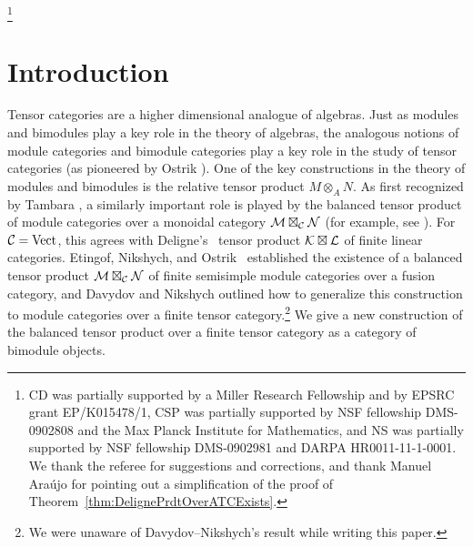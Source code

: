 \documentclass{amsart}
\begin{document}
\thanks{CD was partially supported by a Miller Research Fellowship and by EPSRC grant EP/K015478/1, CSP was partially supported by NSF fellowship DMS-0902808 and the Max Planck Institute for Mathematics, and NS was partially supported by NSF fellowship DMS-0902981 and DARPA HR0011-11-1-0001.  We thank the referee for suggestions and corrections, and thank Manuel Ara\'ujo for pointing out a simplification of the proof of Theorem~\ref{thm:DelignePrdtOverATCExists}.
}


\maketitle	

\tikzexternaldisable


\section{Introduction}

Tensor categories are a higher dimensional analogue of algebras.  Just as modules and bimodules play a key role in the theory of algebras, the analogous notions of module categories and bimodule categories play a key role in the study of tensor categories (as pioneered by Ostrik \cite{MR1976459}).  One of the key constructions in the theory of modules and bimodules is the relative tensor product $M \otimes_A N$.  As first recognized by Tambara \cite{tambara}, a similarly important role is played by the balanced tensor product of module categories over a monoidal category $\mathcal M \boxtimes_\mathcal C \mathcal N$ (for example, see \cite{MR1966524, 0909.3140, MR2511638, MR2909758, 1202.4396, MR3022755, MR3063919}).  For $\mathcal C = \mathrm{Vect}$, this agrees with Deligne's~\cite{MR1106898} tensor product $\mathcal K \boxtimes \mathcal L$ of finite linear categories.  Etingof, Nikshych, and Ostrik~\cite{0909.3140} established the existence of a balanced tensor product $\mathcal M \boxtimes_{\mathcal C} \mathcal N$ of finite semisimple module categories over a fusion category, and Davydov and Nikshych \cite[\S 2.7]{MR3107567} outlined how to generalize this construction to module categories over a finite tensor category.\footnote{We were unaware of Davydov--Nikshych's result while writing this paper.}  We give a new construction of the balanced tensor product over a finite tensor category as a category of bimodule objects.
\end{document}
